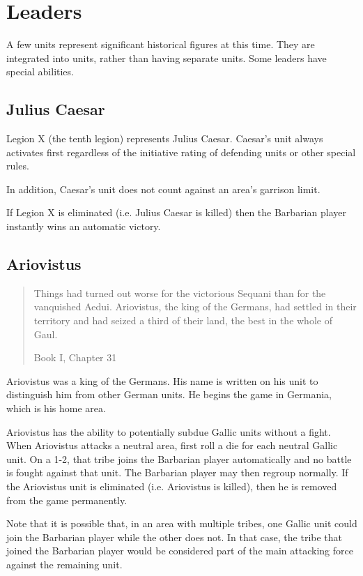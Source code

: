 \section{Leaders}
\par
A few units represent significant historical figures at this time. They are integrated into units, rather than having separate units. Some leaders have special abilities.

\subsection{Julius Caesar}
\par
Legion X (the tenth legion) represents Julius Caesar. Caesar’s unit always activates first regardless of the initiative rating of defending units or other special rules.

In addition, Caesar’s unit does not count against an area’s garrison limit.

If Legion X is eliminated (i.e. Julius Caesar is killed) then the Barbarian player instantly wins an automatic victory.

\subsection{Ariovistus}
\blockquote[Book I, Chapter 31]{Things had turned out worse for the victorious Sequani than for the vanquished Aedui. Ariovistus, the king of the Germans, had settled in their territory and had seized a third of their land, the best in the whole of Gaul.}
\par
Ariovistus was a king of the Germans. His name is written on his unit to distinguish him from other German units. He begins the game in Germania, which is his home area.

Ariovistus has the ability to potentially subdue Gallic units without a fight. When Ariovistus attacks a neutral area, first roll a die for each neutral Gallic unit. On a 1-2, that tribe joins the Barbarian player automatically and no battle is fought against that unit. The Barbarian player may then regroup normally. If the Ariovistus unit is eliminated (i.e. Ariovistus is killed), then he is removed from the game permanently.

Note that it is possible that, in an area with multiple tribes, one Gallic unit could join the Barbarian player while the other does not. In that case, the tribe that joined the Barbarian player would be considered part of the main attacking force against the remaining unit.

